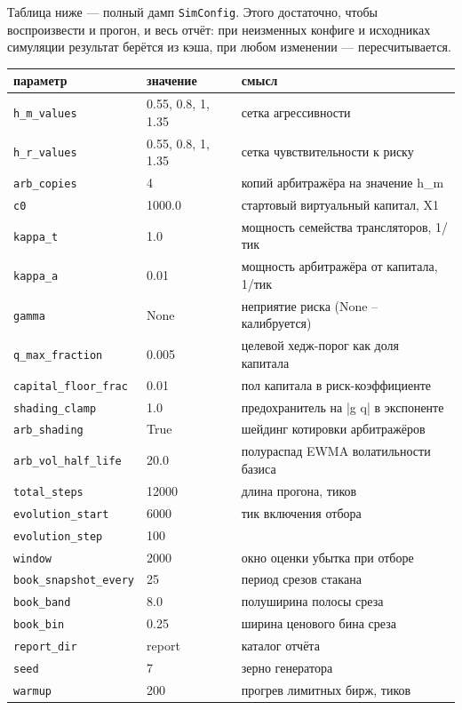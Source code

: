 \documentclass[11pt,a4paper]{article}
\newcommand{\code}[1]{\texttt{\small #1}}
\begin{document}
Таблица ниже --- полный дамп \code{SimConfig}. Этого достаточно, чтобы
воспроизвести и прогон, и весь отчёт: при неизменных конфиге и исходниках
симуляции результат берётся из кэша, при любом изменении --- пересчитывается.

\begin{longtable}{p{}p{}p{}}
\toprule
параметр & значение & смысл \\
\midrule
\endhead
\code{h\_m\_values} & 0.55, 0.8, 1, 1.35 & сетка агрессивности \\
\code{h\_r\_values} & 0.55, 0.8, 1, 1.35 & сетка чувствительности к риску \\
\code{arb\_copies} & 4 & копий арбитражёра на значение h_m \\
\code{c0} & 1000.0 & стартовый виртуальный капитал, X1 \\
\code{kappa\_t} & 1.0 & мощность семейства трансляторов, 1/тик \\
\code{kappa\_a} & 0.01 & мощность арбитражёра от капитала, 1/тик \\
\code{gamma} & None & неприятие риска (None -- калибруется) \\
\code{q\_max\_fraction} & 0.005 & целевой хедж-порог как доля капитала \\
\code{capital\_floor\_frac} & 0.01 & пол капитала в риск-коэффициенте \\
\code{shading\_clamp} & 1.0 & предохранитель на |g q| в экспоненте \\
\code{arb\_shading} & True & шейдинг котировки арбитражёров \\
\code{arb\_vol\_half\_life} & 20.0 & полураспад EWMA волатильности базиса \\
\code{total\_steps} & 12000 & длина прогона, тиков \\
\code{evolution\_start} & 6000 & тик включения отбора \\
\code{evolution\_step} & 100 &  \\
\code{window} & 2000 & окно оценки убытка при отборе \\
\code{book\_snapshot\_every} & 25 & период срезов стакана \\
\code{book\_band} & 8.0 & полуширина полосы среза \\
\code{book\_bin} & 0.25 & ширина ценового бина среза \\
\code{report\_dir} & report & каталог отчёта \\
\code{seed} & 7 & зерно генератора \\
\code{warmup} & 200 & прогрев лимитных бирж, тиков \\

\end{longtable}
\end{document}
